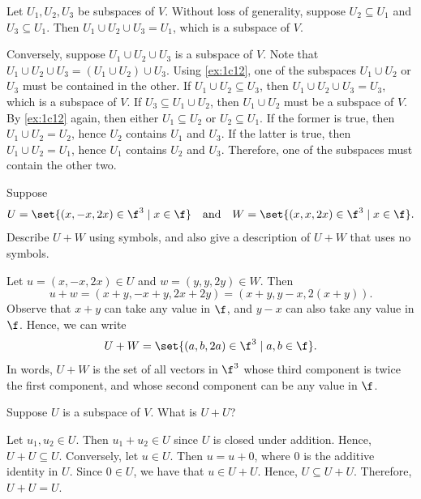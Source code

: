 \begin{sol}
    Let $U_1, U_2, U_3$ be subspaces of $V$. Without loss of generality, suppose $U_2 \subseteq U_1$ and $U_3 \subseteq U_1$. Then $U_1 \cup U_2 \cup U_3 = U_1$, which is a subspace of $V$.

    Conversely, suppose $U_1 \cup U_2 \cup U_3$ is a subspace of $V$. Note that $U_1 \cup U_2 \cup U_3 = (U_1 \cup U_2) \cup U_3$. Using \autoref{ex:1c12}, one of the subspaces $U_1 \cup U_2$ or $U_3$ must be contained in the other. If $U_1 \cup U_2 \subseteq U_3$, then $U_1 \cup U_2 \cup U_3 = U_3$, which is a subspace of $V$. If $U_3 \subseteq U_1 \cup U_2$, then $U_1 \cup U_2$ must be a subspace of $V$. By \autoref{ex:1c12} again, then either $U_1 \subseteq U_2$ or $U_2 \subseteq U_1$. If the former is true, then $U_1 \cup U_2 = U_2$, hence $U_2$ contains $U_1$ and $U_3$. If the latter is true, then $U_1 \cup U_2 = U_1$, hence $U_1$ contains $U_2$ and $U_3$. Therefore, one of the subspaces must contain the other two.
\end{sol}

\begin{exercise}[1c14]
    Suppose
    \[U = \set{(x, -x, 2x) \in \f^3 \mid x \in \f} \quad \text{and} \quad W = \set{(x, x, 2x) \in \f^3 \mid x \in \f}.\]
    Describe $U + W$ using symbols, and also give a description of $U + W$ that uses no symbols.
\end{exercise}

\begin{sol}
    Let $u = (x, -x, 2x) \in U$ and $w = (y, y, 2y) \in W$. Then
    \[u + w = (x + y, -x + y, 2x + 2y) = (x + y, y - x, 2(x + y)).\]
    Observe that $x + y$ can take any value in $\f$, and $y - x$ can also take any value in $\f$. Hence, we can write
    \[U + W = \set{(a, b, 2a) \in \f^3 \mid a, b \in \f}.\]
    In words, $U + W$ is the set of all vectors in $\f^3$ whose third component is twice the first component, and whose second component can be any value in $\f$.
\end{sol}

\begin{exercise}[1c15]
    Suppose $U$ is a subspace of $V$. What is $U + U$?
\end{exercise}

\begin{sol}
    Let $u_1, u_2 \in U$. Then $u_1 + u_2 \in U$ since $U$ is closed under addition. Hence, $U + U \subseteq U$. Conversely, let $u \in U$. Then $u = u + 0$, where $0$ is the additive identity in $U$. Since $0 \in U$, we have that $u \in U + U$. Hence, $U \subseteq U + U$. Therefore, $U + U = U$.
\end{sol}


